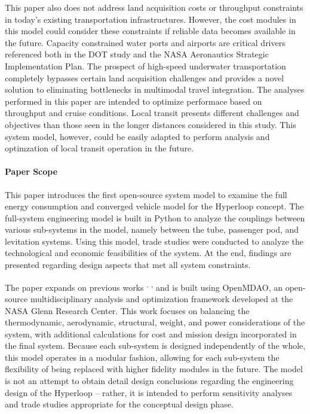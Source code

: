 	This paper also does not address land acquisition costs or throughput
	constraints in today's existing transportation infrastructures.
	However, the cost modules in this model could consider these constraints if
	reliable data becomes available in the future.
	Capacity constrained water ports and airports are critical drivers referenced
	both in the DOT study and the NASA Aeronautics Strategic
	Implementation Plan. The prospect of high-speed underwater transportation
	completely bypasses certain land acquisition challenges and provides a novel solution
	to eliminating bottlenecks in multimodal travel integration. The analyses performed in this paper
	are intended to optimize performace based on throughput and cruise conditions.
	Local transit presents different challenges and objectives than those seen in the longer distances
	considered in this study. This system model, however, could be easily adapted to perform
	analysis and optimzation of local transit operation in the future.\\

\paragraph{Paper Scope}
	This paper introduces the first open-source system model to examine the
	full energy consumption and converged vehicle model for the Hyperloop concept.
	The full-system engineering model is built in Python to analyze the couplings
	between various sub-systems in the model, namely between the tube, passenger pod, and
	levitation systems. Using this model, trade studies were conducted to analyze the technological
	and economic feasibilities of the system.
	At the end, findings are presented regarding design aspects that
	met all system constraints.

	The paper expands on previous works \cite{Chin} \textsuperscript{,}
	\cite{goodwin2009cantera}\textsuperscript{,} \cite{GrayBenchmarking2013}
	and is built using OpenMDAO, an open-source multidisciplinary analysis and optimization framework
	developed at the NASA Glenn Research Center.
	This work focuses on balancing the thermodynamic, aerodynamic, structural,
	weight, and power considerations of the system, with additional calculations for cost
	and mission design incorporated in the final system. Because each sub-system
	is designed independently of the whole, this model operates in a modular fashion, allowing
	for each sub-system the flexibility of being replaced with higher fidelity modules in the future.
	The model is not an attempt to obtain detail design conclusions regarding the
	engineering design of the Hyperloop -- rather, it is intended to perform sensitivity analyses and
	trade studies appropriate for the conceptual design phase.


